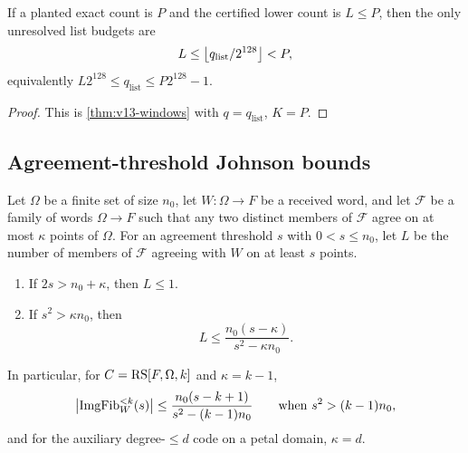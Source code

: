 \begin{corollary}\label{cor:v13-list-windows}
If a planted exact count is $P$ and the certified lower count is $L\le P$, then the only unresolved list budgets are
\[
        L\le \left\lfloor q_{\mathrm{list}}/2^{128}\right\rfloor<P,
\]
equivalently $L2^{128}\le q_{\mathrm{list}}\le P2^{128}-1$.
\end{corollary}

\begin{proof}
This is \cref{thm:v13-windows} with $q=q_{\mathrm{list}}$, $K=P$.
\end{proof}

\subsection{Agreement-threshold Johnson bounds}

\begin{theorem}\label{thm:v13-johnson-list}
Let $\Omega$ be a finite set of size $n_0$, let $W:\Omega\to F$ be a received word, and let $\mathcal F$ be a family of words $\Omega\to F$ such that any two distinct members of $\mathcal F$ agree on at most $\kappa$ points of $\Omega$.  For an agreement threshold $s$ with $0<s\le n_0$, let $L$ be the number of members of $\mathcal F$ agreeing with $W$ on at least $s$ points.
\begin{enumerate}[label=\textup{(\roman*)}]
\item If $2s>n_0+\kappa$, then $L\le1$.
\item If $s^2>\kappa n_0$, then
\[
        L
        \le
        \frac{n_0(s-\kappa)}{s^2-\kappa n_0}.
\]
\end{enumerate}
In particular, for $C=\mathrm{RS}[F,\Omega,k]$ and $\kappa=k-1$,
\[
        \bigl|\operatorname{ImgFib}_W^{<k}(s)\bigr|\le\frac{n_0(s-k+1)}{s^2-(k-1)n_0}
        \qquad\text{when }s^2>(k-1)n_0,
\]
and for the auxiliary degree-$\le d$ code on a petal domain, $\kappa=d$.
\end{theorem}


